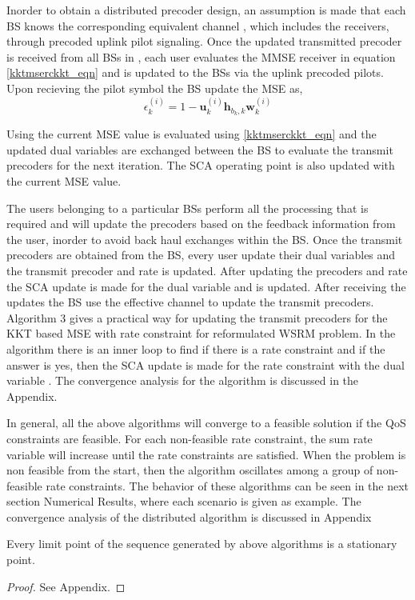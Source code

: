 Inorder to obtain a distributed precoder design, an assumption is made that each \ac{BS}  knows the corresponding equivalent channel , which includes the receivers,  through precoded uplink pilot signaling. Once the updated transmitted precoder is received from all \ac{BS}s in , each user evaluates the \ac{MMSE} receiver in equation \eqref{kktmserckkt_eqn} and is updated to the \ac{BS}s via the uplink precoded pilots. Upon recieving the pilot symbol the \ac{BS} update the \ac{MSE} as,
\begin{equation}
\epsilon_k^{(i)} = 1 - \mathbf{u}_k^{(i)} \mathbf{h}_{{b_k},k} \mathbf{w}_k^{(i)}
\label{kktmserc5_eqn}
\end{equation}

Using the current \ac{MSE} value  is evaluated using \eqref{kktmserckkt_eqn} and the updated dual variables are exchanged between the \ac{BS} to evaluate the transmit precoders  for the next iteration. The \ac{SCA} operating point is also updated with the current \ac{MSE} value.

The users belonging to a particular \ac{BS}s perform all the processing that is required and will update the precoders based on the feedback information from the user, inorder to avoid back haul exchanges within the \ac{BS}. Once the transmit precoders are obtained from the \ac{BS}, every user update their dual variables  and the transmit precoder  and rate  is updated. After updating the precoders and rate the \ac{SCA} update is made for the dual variable  and is updated. After receiving the updates the \ac{BS} use the effective channel to update the transmit precoders. Algorithm 3 gives a practical way for updating the transmit precoders for the \ac{KKT} based MSE with rate constraint for reformulated \ac{WSRM} problem. In the algorithm there is an inner loop to find if there is a rate constraint and if the answer is yes, then the \ac{SCA} update is made for the rate constraint with the dual variable . The convergence analysis for the algorithm is discussed in the Appendix.

In general, all the above algorithms will converge to a feasible solution if the QoS constraints are feasible. For each non-feasible rate constraint, the sum rate variable  will increase until the rate constraints are satisfied. When the problem is non feasible from the start, then the algorithm oscillates among a group of non-feasible rate constraints. The behavior of these algorithms can be seen in the next section Numerical Results, where each scenario is given as example. The convergence analysis of the distributed algorithm is discussed in Appendix 

\newpage
\begin{theorem}
	Every limit point of the sequence generated by above algorithms is a stationary point.
\end{theorem}
\begin{proof}
	See Appendix.
\end{proof}	